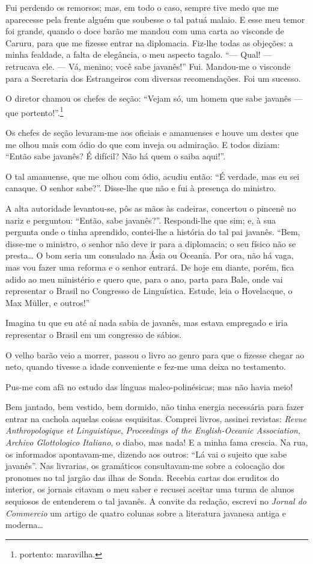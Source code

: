 Fui perdendo os remorsos; mas, em todo o caso, sempre tive medo que me
aparecesse pela frente alguém que soubesse o tal patuá malaio. E esse
meu temor foi grande, quando o doce barão me mandou com uma carta ao
visconde de Caruru, para que me fizesse entrar na diplomacia. Fiz-lhe
todas as objeções: a minha fealdade, a falta de elegância, o meu aspecto
tagalo. ``--- Qual! --- retrucava ele. --- Vá, menino; você sabe
javanês!'' Fui. Mandou-me o visconde para a Secretaria dos Estrangeiros
com diversas recomendações. Foi um sucesso.

O diretor chamou os chefes de seção: ``Vejam só, um homem que sabe
javanês --- que portento!''.\footnote{portento: maravilha.}

Os chefes de seção levaram-me aos oficiais e amanuenses e houve um
destes que me olhou mais com ódio do que com inveja ou admiração. E
todos diziam: ``Então sabe javanês? É difícil? Não há quem o saiba
aqui!''.

O tal amanuense, que me olhou com ódio, acudiu então: ``É verdade, mas
eu sei canaque. O senhor sabe?''. Disse-lhe que não e fui à presença do
ministro.

A alta autoridade levantou-se, pôs as mãos às cadeiras, concertou o
pincenê no nariz e perguntou: ``Então, sabe javanês?''. Respondi-lhe que
sim; e, à sua pergunta onde o tinha aprendido, contei-lhe a história do
tal pai javanês. ``Bem, disse-me o ministro, o senhor não deve ir para a
diplomacia; o seu físico não se presta\ldots{} O bom seria um consulado
na Ásia ou Oceania. Por ora, não há vaga, mas vou fazer uma reforma e o
senhor entrará. De hoje em diante, porém, fica adido ao meu ministério e
quero que, para o ano, parta para Bale, onde vai representar o Brasil no
Congresso de Linguística. Estude, leia o Hovelacque, o Max Müller, e
outros!''

Imagina tu que eu até aí nada sabia de javanês, mas estava empregado e
iria representar o Brasil em um congresso de sábios.

O velho barão veio a morrer, passou o livro ao genro para que o fizesse
chegar ao neto, quando tivesse a idade conveniente e fez-me uma deixa no
testamento.

Pus-me com afã no estudo das línguas maleo-polinésicas; mas não havia
meio!

Bem jantado, bem vestido, bem dormido, não tinha energia necessária para
fazer entrar na cachola aquelas coisas esquisitas. Comprei livros,
assinei revistas: \emph{Revue Anthropologique et Linguistique},
\emph{Proceedings of the English-Oceanic Association}, \emph{Archivo
Glottologico Italiano}, o diabo, mas nada! E a minha fama crescia. Na
rua, os informados apontavam-me, dizendo aos outros: ``Lá vai o sujeito
que sabe javanês''. Nas livrarias, os gramáticos consultavam-me sobre a
colocação dos pronomes no tal jargão das ilhas de Sonda. Recebia cartas
dos eruditos do interior, os jornais citavam o meu saber e recusei
aceitar uma turma de alunos sequiosos de entenderem o tal javanês. A
convite da redação, escrevi no \emph{Jornal do Commercio} um artigo de
quatro colunas sobre a literatura javanesa antiga e moderna\ldots{}

